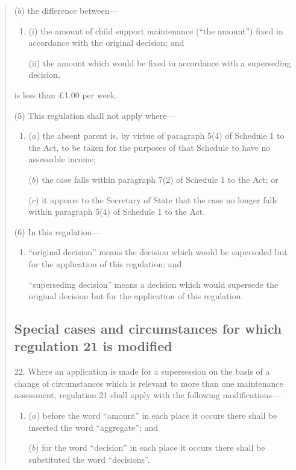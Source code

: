 \documentclass[12pt,a4paper]{article}
\begin{document}
\begin{quotation}
\begin{enumerate}
($b$) the difference between---
\begin{enumerate}\item[]
(i) the amount of child support maintenance (“the amount”) fixed in accordance with the original decision; and

(ii) the amount which would be fixed in accordance with a superseding decision, 
\end{enumerate}
is less than £1.00 per week.
\end{enumerate}

(5) This regulation shall not apply where---
\begin{enumerate}\item[]
($a$) the absent parent is, by virtue of paragraph 5(4) of Schedule 1 to the Act, to be taken for the purposes of that Schedule to have no assessable income;

($b$) the case falls within paragraph 7(2) of Schedule 1 to the Act; or

($c$) it appears to the Secretary of State that the case no longer falls within paragraph 5(4) of Schedule 1 to the Act.
\end{enumerate}

(6) In this regulation---
\begin{enumerate}\item[]
“original decision” means the decision which would be superseded but for the application of this regulation; and

“superseding decision” means a decision which would supersede the original decision but for the application of this regulation.
\end{enumerate}

\subsection*{Special cases and circumstances for which regulation 21 is modified}

22.  Where an application is made for a supersession on the basis of a change of circumstances which is relevant to more than one maintenance assessment, regulation 21 shall apply with the following modifications---
\begin{enumerate}\item[]
($a$) before the word “amount” in each place it occurs there shall be inserted the word “aggregate”; and

($b$) for the word “decision” in each place it occurs there shall be substituted the word “decisions”.
\end{enumerate}


\end{quotation}
\end{document}
